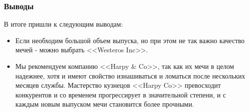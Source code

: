 \documentclass[10pt,pdf,hyperref={unicode}]{beamer}
\begin{document}
\begin{frame}
\frametitle{Выводы} 

В итоге пришли к следующим выводам:
\begin{itemize}
\item Если необходим большой объем выпуска, но при этом не так важно качество мечей - можно выбрать <<Westeros Inc>>.
\item Мы рекомендуем компанию <<Harpy \& Co>>, так как их мечи в целом надежнее, хотя и имеют свойство изнашиваться и ломаться после нескольких месяцев службы. Мастерство кузнецов <<Harpy Co>> превосходит конкурентов и со временем прогрессирует в значительной степени, и с каждым новым выпуском мечи становится более прочными. 
\end{itemize}
\end{frame}
\end{document}
